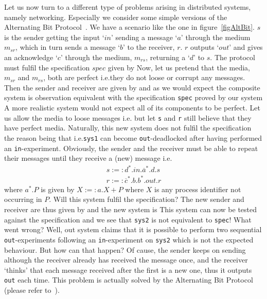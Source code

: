 Let us now turn to a different type of problems arising in distributed systems, namely networking. Especially we consider some simple versions of the Alternating Bit Protocol~\cite{Tanenbaum}. We have a scenario like the one in figure~\ref{figAltBit}. $s$ is the sender getting the input `$in$' sending a message `$a$' through the medium $m_{sr}$, which in turn sends a message `$b$' to the receiver, $r$. $r$ outputs `$out$' and gives an acknowledge `$c$' through the medium, $m_{rs}$, returning a `$d$' to $s$. The protocol must fulfil the specification $spec$ given by
%
Now, let us pretend that the media, $m_{sr}$ and $m_{rs}$, both are perfect i.e.\@ they do not loose or corrupt any messages.
%
Then the sender and receiver are given by
%
and as we would expect the composite system
%
is observation equivalent with the specification \verb!spec! proved by our system
%
A more realistic system would not expect all of its components to be perfect. Let us allow the media to loose messages i.e.\@
{}%
but let \verb!s! and \verb!r! still believe that they have perfect media. Naturally, this new system
%
does not fulfil the specification the reason being that
%
i.e.\@ \verb!sys1! can become \verb!out!-deadlocked after having performed an \verb!in!-experiment. Obviously, the sender and the receiver must be able to repeat their messages until they receive a (new) message i.e.\@
\[\begin{array}{l}
s :=: d^{*}.in.\overline{a}^{*}.d.s\\
r :=: \overline{c}^{*}.b.b^{*}.out.r
\end{array}
\]
where $a^{*}.P$ is given by $X:=: a.X + P$ where $X$ is any process identifier not occurring in $P$. Will this system fulfil the specification? The new sender and receiver are thus given by
%
and the new system is
%
This system can now be tested against the specification
%
and we see that \verb#sys2# is not equivalent to \verb#spec#! What went wrong? Well, out system claims that it is possible to perform two sequential \verb#out#-experiments following an \verb#in#-experiment on \verb#sys2# which is not the expected behaviour. But how can that happen? Of cause, the sender keeps on sending although the receiver already has received the message once, and the receiver `thinks' that each message received after the first is a new one, thus it outputs \verb#out# each time. This problem is actually solved by the Alternating Bit Protocol (please refer to~\cite{Tanenbaum}).


